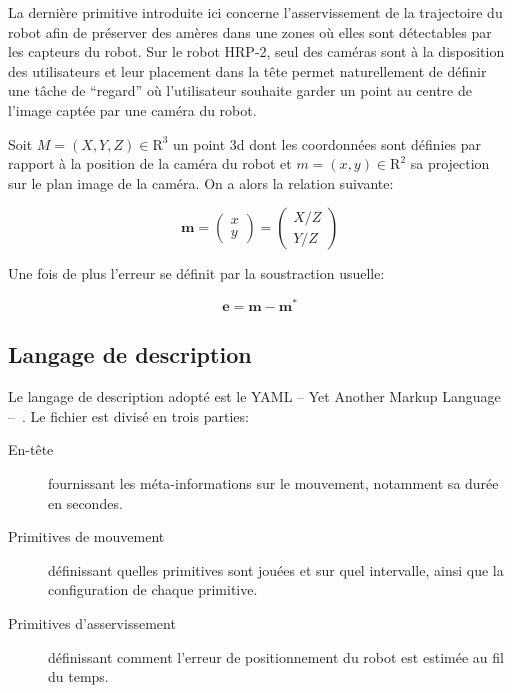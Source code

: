 La dernière primitive introduite ici concerne l'asservissement de la
trajectoire du robot afin de préserver des amères dans une zones où
elles sont détectables par les capteurs du robot. Sur le robot HRP-2,
seul des caméras sont à la disposition des utilisateurs et leur
placement dans la tête permet naturellement de définir une tâche de
``regard'' où l'utilisateur souhaite garder un point au centre de
l'image captée par une caméra du robot.

Soit \mbox{$M = (X, Y, Z) \in \mathrm{R}^3$} un point 3d dont les
coordonnées sont définies par rapport à la position de la caméra du
robot et \mbox{$m = (x, y) \in \mathrm{R}^2$} sa projection sur le
plan image de la caméra. On a alors la relation suivante:

\begin{equation}
  \mathbf{m} = \left(
  \begin{array}{c}
    x\\
    y
  \end{array}
  \right) = \left(
  \begin{array}{c}
    X / Z\\
    Y / Z
  \end{array}
  \right)
\end{equation}


Une fois de plus l'erreur se définit par la soustraction usuelle:

\begin{equation}
  \mathbf{e} = \mathbf{m} - \mathbf{m}^*
\end{equation}


\subsection{Langage de description}

Le langage de description adopté est le YAML -- Yet Another Markup
Language --~\citep{yaml}. Le fichier est divisé en trois parties:
\begin{description}
\item[En-tête] fournissant les méta-informations sur le mouvement, notamment sa durée en secondes.
\item[Primitives de mouvement] définissant quelles primitives sont
  jouées et sur quel intervalle, ainsi que la configuration de chaque
  primitive.
\item[Primitives d'asservissement] définissant comment l'erreur de
  positionnement du robot est estimée au fil du temps.
\end{description}


